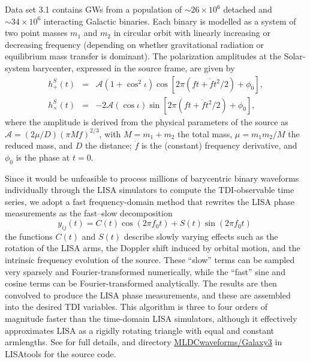 \documentclass{iopart}
\begin{document}
Data set 3.1 contains GWs from a population of $\sim 26 \times 10^6$ detached and $\sim 34 \times 10^6$ interacting Galactic binaries. Each binary is modelled as a system of two point masses $m_1$ and $m_2$ in circular orbit with linearly increasing or decreasing frequency (depending on whether gravitational radiation or equilibrium mass transfer is dominant). The polarization amplitudes at the Solar-system barycenter, expressed in the source frame, are given by
%
\begin{eqnarray}
h^S_+(t) & = & \mathcal{A} \left(1 + \cos^2{\iota}\right) \cos[2\pi (f t + \dot{f} t^2 / 2) + \phi_0], \\
h^S_\times(t) & = & -2 \mathcal{A} (\cos{\iota}) \sin[2\pi (f t + \dot{f} t^2 / 2) + \phi_0], \nonumber
\end{eqnarray}
%
where the amplitude is derived from the physical parameters of the source as $\mathcal{A} = (2 \mu / D) (\pi M f)^{2/3}$, with $M = m_1 + m_2$ the total mass, $\mu = m_1 m_2 / M $ the reduced mass, and $D$ the distance; $\dot{f}$ is the (constant) frequency derivative, and $\phi_0$ is the phase at $t = 0$.

Since it would be unfeasible to process millions of barycentric binary waveforms individually through the LISA simulators to compute the TDI-observable time series, we adopt a fast frequency-domain method \cite{Cornish:2007if} that rewrites the LISA phase measurements as the fast--slow decomposition
%
\begin{equation}
y_{ij}(t) = C(t) \cos(2 \pi f_0 t) + S(t) \sin(2 \pi f_0 t) \;
\end{equation}
%
the functions $C(t)$ and $S(t)$ describe slowly varying effects such as the rotation of the LISA arms, the Doppler shift induced by orbital motion, and the intrinsic frequency evolution of the source. These ``slow'' terms can be sampled very sparsely and Fourier-transformed numerically, while the ``fast'' sine and cosine terms can be Fourier-transformed analytically. The results are then convolved to produce the LISA phase measurements, and these are assembled into the desired TDI variables. This algorithm is three to four orders of magnitude faster than the time-domain LISA simulators, although it effectively approximates LISA as a rigidly rotating triangle with equal and constant armlengths. See \cite{Cornish:2007if} for full details, and directory \url{MLDCwaveforms/Galaxy3} in LISAtools for the source code.
\end{document}
